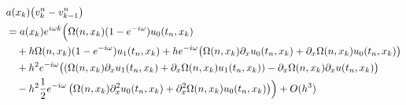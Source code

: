 \begin{align}
\begin{split}
&a(x_k) \bigl( v^n_k - v^n_{k-1} \bigr)\\
&=
a(x_k) e^{i \omega k} \Bigl( \Omega(n,x_k) (1-e^{-i\omega}) u_0(t_n, x_k)\\
&\quad + h \Omega(n,x_k) (1 - e^{-i \omega}) u_1(t_n, x_k) + h e^{-i \omega} \bigl( \Omega(n,x_k) \partial_x u_0(t_n, x_k) + \partial_x \Omega(n,x_k)  u_0(t_n, x_k) \bigr)\\
&\quad + h^2 e^{-i\omega}  \bigl( \left( \Omega(n,x_k) \partial_x u_1(t_n, x_k) + \partial_x \Omega(n,x_k) u_1(t_n,x_k) \right) - \partial_x \Omega(n,x_k) \partial_x u(t_n, x_k) \bigr)\\
&\quad - h^2 \frac{1}{2} e^{-i\omega} \left( \Omega(n,x_k) \partial^2_x u_0(t_n, x_k) + \partial^2_x \Omega(n, x_k) u_0(t_n, x_k) \right)   \Bigr) + O(h^3)\\
\end{split}
\end{align}

